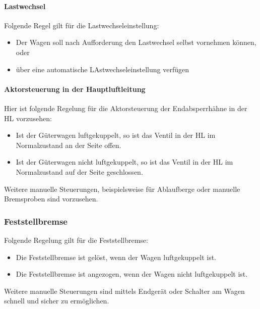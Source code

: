 \paragraph{Lastwechsel}
\begin{feat}
Folgende Regel gilt für die Lastwechseleinstellung:
\begin{itemize}
    \item Der Wagen soll nach Aufforderung den Lastwechsel selbst vornehmen können, oder
    \item über eine automatische LAstwechseleinstellung verfügen
\end{itemize}
\end{feat}

\paragraph{Aktorsteuerung in der Hauptluftleitung}
\begin{feat}
Hier ist folgende Regelung für die Aktorsteuerung der Endabsperrhähne in der \acrshort{HL} vorzusehen:
\begin{itemize}
    \item Ist der Güterwagen luftgekuppelt, so ist das Ventil in der \acrshort{HL} im Normalzustand an der Seite offen.
    \item Ist der Güterwagen nicht luftgekuppelt, so ist das Ventil in der \acrshort{HL} im Normalzustand auf der Seite geschlossen.
\end{itemize}
\end{feat}
\begin{rem} [zu Anf. 47]
Weitere manuelle Steuerungen, beispielsweise für Ablaufberge oder manuelle Bremsproben sind vorzusehen.
\end{rem}

\subsubsection{Feststellbremse}
\begin{feat}
Folgende Regelung gilt für die Feststellbremse:
\begin{itemize}
    \item Die Feststellbremse ist gelöst, wenn der Wagen luftgekuppelt ist.
    \item Die Feststellbremse ist angezogen, wenn der Wagen nicht luftgekuppelt ist.
\end{itemize}
\end{feat}
\begin{rem} [zu Anf. 48]
Weitere manuelle Steuerungen sind mittels Endgerät oder \newline Schalter am Wagen schnell und sicher zu ermöglichen.
\end{rem}

